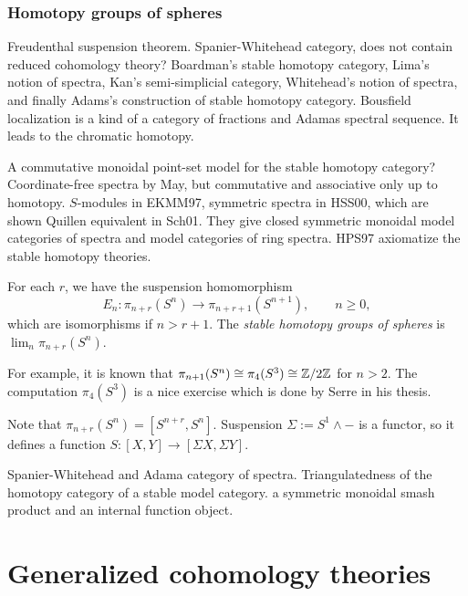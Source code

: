 \documentclass{../../large}
\begin{document}
\section{Homotopy groups of spheres}

Freudenthal suspension theorem.
Spanier-Whitehead category, does not contain reduced cohomology theory?
Boardman's stable homotopy category, Lima's notion of spectra, Kan's semi-simplicial category, Whitehead's notion of spectra, and finally Adams's construction of stable homotopy category.
Bousfield localization is a kind of a category of fractions and Adamas spectral sequence.
It leads to the chromatic homotopy.

A commutative monoidal point-set model for the stable homotopy category?
Coordinate-free spectra by May, but commutative and associative only up to homotopy.
$S$-modules in EKMM97, symmetric spectra in HSS00, which are shown Quillen equivalent in Sch01.
They give closed symmetric monoidal model categories of spectra and model categories of ring spectra.
HPS97 axiomatize the stable homotopy theories.



\begin{prb}
For each $r$, we have the suspension homomorphism
\[E_n:\pi_{n+r}(S^n)\to\pi_{n+r+1}(S^{n+1}),\qquad n\ge0,\]
which are isomorphisms if $n>r+1$.
The \emph{stable homotopy groups of spheres} is $\lim_n\pi_{n+r}(S^n)$.

For example, it is known that $\pi_{n+1}(S^n)\cong\pi_4(S^3)\cong\mathbb{Z}/2\mathbb{Z}$ for $n>2$.
The computation $\pi_4(S^3)$ is a nice exercise which is done by Serre in his thesis.
\end{prb}


Note that $\pi_{n+r}(S^n)=[S^{n+r},S^n]$.
Suspension $\Sigma:=S^1\wedge-$ is a functor, so it defines a function $S:[X,Y]\to[\Sigma X,\Sigma Y]$.


Spanier-Whitehead and Adama category of spectra.
Triangulatedness of the homotopy category of a stable model category.
a symmetric monoidal smash product and an internal function object.




\part{Generalized cohomology theories}
\end{document}
